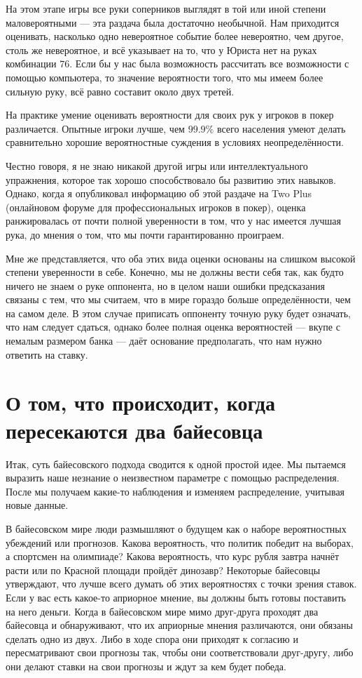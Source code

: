 На этом этапе игры все руки соперников выглядят в той или иной степени маловероятными --- эта раздача была достаточно необычной. Нам приходится оценивать, насколько одно невероятное событие более невероятно, чем другое, столь же невероятное, и всё указывает на то, что у Юриста нет на руках комбинации $7$\clubsuit  $6$\clubsuit. Если бы у нас была возможность рассчитать все возможности с помощью компьютера, то значение вероятности того, что мы имеем более сильную руку, всё равно составит около двух третей.

На практике умение оценивать вероятности для своих рук у игроков в покер различается. Опытные игроки лучше, чем $99.9\%$ всего населения умеют делать сравнительно хорошие вероятностные суждения в условиях неопределённости.

Честно говоря, я не знаю никакой другой игры или интеллектуального упражнения, которое так хорошо способствовало бы развитию этих навыков. Однако, когда я опубликовал информацию об этой раздаче на Two Plus (онлайновом форуме для профессиональных игроков в покер), оценка ранжировалась от почти полной уверенности в том, что у нас имеется лучшая рука, до мнения о том, что мы почти гарантированно проиграем.

Мне же представляется, что оба этих вида оценки основаны на слишком высокой степени уверенности в себе. Конечно, мы не должны вести себя так, как будто ничего не знаем о руке оппонента, но в целом наши ошибки предсказания связаны с тем, что мы считаем, что в мире гораздо больше определённости, чем на самом деле. В этом случае приписать оппоненту точную руку будет означать, что нам следует сдаться, однако более полная оценка вероятностей --- вкупе с немалым размером банка --- даёт основание предполагать, что нам нужно ответить на ставку.


\section{О том, что происходит, когда пересекаются два байесовца}

Итак, суть байесовского подхода сводится к одной простой идее. Мы пытаемся выразить наше незнание о неизвестном параметре с помощью распределения. После мы получаем какие-то наблюдения и изменяем распределение, учитывая новые данные.

В байесовском мире люди размышляют о будущем как о наборе вероятностных убеждений или прогнозов. Какова вероятность, что политик победит на выборах, а спортсмен на олимпиаде? Какова вероятность, что курс рубля завтра начнёт расти или по Красной площади пройдёт динозавр? Некоторые байесовцы утверждают, что лучше всего думать об этих вероятностях с точки зрения ставок. Если у вас есть какое-то априорное мнение, вы должны быть готовы поставить на него деньги. Когда в байесовском мире мимо друг-друга проходят два байесовца и обнаруживают, что их априорные мнения различаются, они обязаны сделать одно из двух. Либо в ходе спора они приходят к согласию и пересматривают свои прогнозы так, чтобы они соответствовали друг-другу, либо они делают ставки на свои прогнозы и ждут за кем будет победа.

